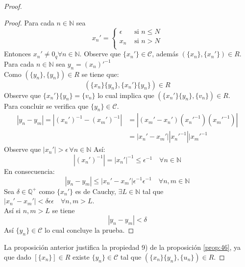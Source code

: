 \begin{proof}
\begin{proof}
  Para cada $n \in \mathbb{N}$ sea
  \[
    x_n' = 
    \begin{cases} 
      \epsilon &\mbox{ si } n \leq N \\
      x_n &\mbox{ si } n > N \\
    \end{cases}
  \]
  Entonces $x_n' \neq 0_q \forall n \in \mathbb{N}$. Observe que $\{x_n'\} \in
  \mathcal{C}$,
  además $(\{x_n\}, \{x_n'\}) \in R$. \\
  Para cada $n \in \mathbb{N}$ sea $y_n = (x_n)'^{-1}$ \\
  Como $(\{y_n\}, \{y_n\}) \in R$ se tiene que:
  \[
    (\{x_n\}\{y_n\}, \{x_n'\}\{y_n\}) \in R
  \]
  Observe que $\{x_n'\}\{y_n\} = \{v_n\}$ lo cual implica que $(\{x_n'\}\{y_n\},
  \{v_n\}) \in R$. \\
  Para concluir se verifica que $\{y_n\} \in \mathcal{C}$. \\
  \begin{align*}
    |y_n - y_m | = | (x_n')^{-1} -(x_m')^{-1} | &= |(x_m' -
    x_n')(x_n'^{-1})(x_m'^{-1})| \\
    &= |x_n'- x_m'||x_n'^{-1}||x_m'^{-1}
  \end{align*}
  Observe que $|x_n'|> \epsilon \, \forall n \in \mathbb{N}$ Así: 
  \[
    |(x_n')^{-1}|= |x_n'|^{-1} \leq \epsilon^{-1} \quad \forall n \in \mathbb{N}
  \]
  En consecuencia:
  \[
    |y_n - y_m| \leq |x_n' - x_m'| \epsilon^{-1}\epsilon^{-1} \quad \forall n,m
    \in \mathbb{N}
  \]
  Sea $\delta \in \mathbb{Q}^+$ como $\{x_n'\}$ es de Cauchy, $\exists L \in
  \mathbb{N}$ tal que $|x_n' - x_m'| < \delta \epsilon \epsilon \quad \forall n,m >
  L$. \\ 
  Así si $n, m > L$ se tiene 
  \[
    |y_n - y_m | < \delta 
  \]
  Así $\{y_n\} \in \mathcal C$ lo cual concluye la prueba.
\end{proof}

La proposición anterior justifica la propiedad 9) de la proposición
\ref{prop:46}, ya que dado $[\{x_n\}] \in  R$ existe $\{y_n\}\in \mathcal{C}$
tal que $(\{x_n\}\{y_n\} , \{u_n\}) \in R$.


\end{proof}
